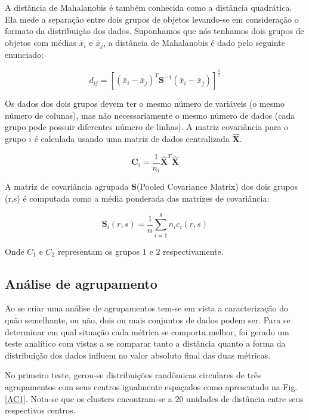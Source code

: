 A distância de Mahalanobis é também conhecida como a distância quadrática. Ela mede a separação entre dois grupos de objetos levando-se em consideração o formato da distribuição dos dados. Suponhamos que nós tenhamos dois grupos de objetos com médias $\bar{x}_{i}$ e $\bar{x}_{j}$, a distância de Mahalanobis é dado pelo seguinte enunciado:

\begin{equation}
d_{ij}=[(\bar{x}_{i}-\bar{x}_{j})^{T}\textbf{S}^{-1}(\bar{x}_{i}-\bar{x}_{j})]^{\frac{1}{2}}
\label{maha}
\end{equation}

Os dados dos dois grupos devem ter o mesmo número de variáveis (o mesmo número de colunas), mas não necessariamente o mesmo número de dados (cada grupo pode possuir diferentes número de linhas). A matriz covariância para o grupo $i$ é calculada usando uma matriz de dados centralizada $\hat{\textbf{X}}$.


\begin{equation}
\textbf{C}_{i}=\dfrac{1}{n_{i}} \hat{\textbf{X}}^{T}\hat{\textbf{X}}
\end{equation}

A matriz de covariância agrupada $\textbf{S}$(Pooled Covariance Matrix) dos dois grupos (r,s) é computada como a média ponderada das matrizes de covariância:

\begin{equation}
\textbf{S}_{i}(r,s)=\dfrac{1}{n}\sum^{g}_{i=1}n_{i}c_{i}(r,s)
\end{equation}

Onde $C_{1}$ e $C_{2}$ representam os grupos $1$ e $2$ respectivamente.


\subsection{Análise de agrupamento}
\label{teste}

Ao se criar uma análise de agrupamentos tem-se em vista a caracterização do quão semelhante, ou não, dois ou mais conjuntos de dados podem ser.  Para se determinar em qual situação cada métrica se comporta melhor, foi gerado um teste analítico com vistas a se comparar tanto a distância quanto a forma da distribuição dos dados influem no valor absoluto final das duas métricas. 

No primeiro teste, gerou-se distribuições randômicas circulares de três agrupamentos com seus centros igualmente espaçados como apresentado na Fig. \ref{AC1}. Nota-se que os clusters encontram-se a $20$ unidades de distância entre seus respectivos centros. 

